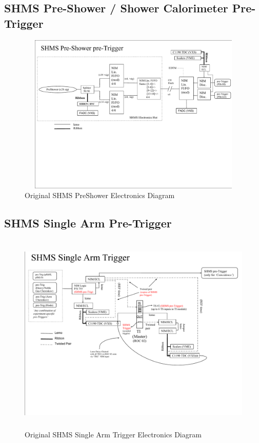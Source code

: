 \documentclass[11pt]{article}
\begin{document}
\begin{appendices}
\subsection{SHMS Pre-Shower / Shower Calorimeter Pre-Trigger}
\label{appendix:Appx7}
\begin{figure}[h!]
  \centering
  \includegraphics[width=7.0in, height=3.0in]{../SHMS_preSh_trigger.pdf}
  \caption{Original SHMS PreShower Electronics Diagram}
  \label{fig:shms_preSh_trg}
\end{figure}
\subsection{SHMS Single Arm Pre-Trigger}
\label{appendix:Appx8}
\begin{figure}[h!]
  \centering
  \includegraphics[width=7.0in, height=3.8in]{../SHMS_SingleArm_Trigger.pdf}
  \caption{Original SHMS Single Arm Trigger Electronics Diagram}
  \label{fig:shms_one_arm_trg}
\end{figure}
\newpage

\end{appendices}
\end{document}
